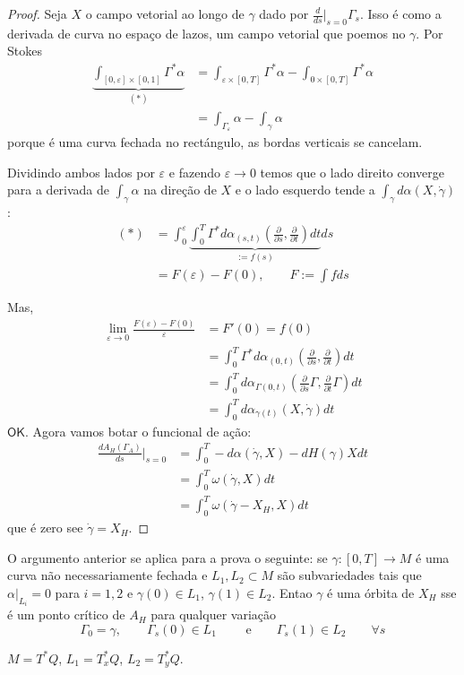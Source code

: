 \begin{proof}\leavevmode
Seja $X$ o campo vetorial ao longo de $\gamma$ dado por $\frac{d}{ds}\Big|_{s=0}\Gamma_s$. {\color{5}Isso é como a derivada de curva no espaço de lazos, um campo vetorial que poemos no $\gamma$.} Por Stokes
\begin{align*}
	\underbrace{\int_{[0,\varepsilon]\times [0,1]}\Gamma ^* \alpha}_{(*)}&=\int_{\varepsilon\times [0,T]}\Gamma^*\alpha-\int_{0 \times [0,T]}\Gamma ^*\alpha\\
	&=\int_{\Gamma_\varepsilon}\alpha-\int_{\gamma}\alpha
\end{align*}
{\color{5}porque é uma curva fechada no rectángulo, as bordas verticais se cancelam.}

Dividindo ambos lados por $\varepsilon$ e fazendo $\varepsilon \to 0$ temos que o lado direito converge para a derivada de $\int_{\gamma}\alpha$ na direção de $X$ e o lado esquerdo tende a $\int_{\gamma}d \alpha(X,\dot{\gamma})$:
\begin{align*}
	(*)&=\int_{0}^\varepsilon\underbrace{\int_{0}^T \Gamma^*d\alpha_{(s,t)}\left( \frac{\partial }{\partial s},\frac{\partial }{\partial t} \right) dt}_{:=f(s)}ds\\
	&=F(\varepsilon)-F(0),\qquad F:=\int fds
\end{align*}

Mas,
\begin{align*}
\lim_{\varepsilon \to 0} \frac{F(\varepsilon)-F(0)}{\varepsilon}&=F'(0)=f(0)\\
&=\int_{0}^T \Gamma ^*d\alpha_{(0,t)}\left( \frac{\partial }{\partial s},\frac{\partial }{\partial t} \right) dt\\
&=\int_{0}^T d \alpha_{\Gamma(0,t)}\left( \frac{\partial }{\partial s}\Gamma,\frac{\partial }{\partial t}\Gamma \right) dt\\
&=\int_{0}^Td \alpha_{\gamma(t)}(X,\dot{\gamma})dt
\end{align*}
$\mathsf{OK}$. Agora vamos botar o funcional de ação:
\begin{align*}
	\frac{d A_H(\Gamma_A)}{ds}\Big|_{s=0}&=\int_{0}^T-d \alpha(\dot{\gamma},X)-dH(\gamma)Xdt\\
					     &=\int_{0}^T \omega(\dot{\gamma},X)dt\\
					     &=\int_{0}^T\omega( \dot{\gamma}-X_H,X)dt
\end{align*}
que é zero see $\dot{\gamma}=X_H$.
\end{proof}

\begin{remark}\leavevmode
	O argumento anterior se aplica para a prova o seguinte: se $\gamma:[0,T]\to M$ é uma curva não necessariamente fechada e $L_1,L_2\subset M$ são subvariedades tais que $\alpha|_{L_i}=0$ para $i=1,2$ e  $\gamma(0)\in L_1$, $\gamma(1)\in L_2$. Entao $\gamma$ é uma órbita de $X_H$ sse é um ponto crítico de $A_H$ para qualquer variação 
	\[\Gamma_0=\gamma,\qquad \Gamma_s(0)\in L_1\qquad \text{ e} \qquad \Gamma_s(1)\in L_2\qquad \forall s\]

	\begin{example}\leavevmode
		$M=T^*Q$, $L_1=T^*_xQ$, $L_2=T^*_yQ$.
	\end{example}
\end{remark}

